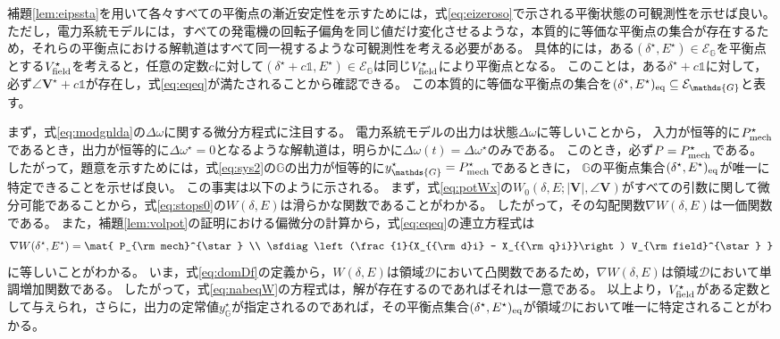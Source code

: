 \documentclass[tombow,dvipdfmx]{corona-a5}
\begin{document}
\begin{証明}
補題\ref{lem:eipssta}を用いて各々すべての平衡点の漸近安定性を示すためには，式\ref{eq:eizeroso}で示される平衡状態の可観測性を示せば良い。
ただし，電力系統モデルには，すべての発電機の回転子偏角を同じ値だけ変化させるような，本質的に等価な平衡点の集合が存在するため，それらの平衡点における解軌道はすべて同一視するような可観測性を考える必要がある。
具体的には，ある$(\delta^{\star},E^{\star}) \in \mathcal{E}_{\mathds{G}}$を平衡点とする$V_{\rm field}^{\star}$を考えると，任意の定数$c$に対して$(\delta^{\star}+c \mathds{1},E^{\star}) \in \mathcal{E}_{\mathds{G}}$は同じ$V_{\rm field}^{\star}$により平衡点となる。
このことは，ある$\delta^{\star}+c \mathds{1}$に対して，必ず$\angle \bm{V}^{\star}+c \mathds{1}$が存在し，式\ref{eq:eqeq}が満たされることから確認できる。
この本質的に等価な平衡点の集合を$(\delta^{\star} ,E^{\star})_{\rm eq} \subseteq \mathcal{E}_{\mathds{G}}$と表す。

まず，式\ref{eq:modgnlda}の$\Delta \omega$に関する微分方程式に注目する。
電力系統モデルの出力は状態$\Delta \omega$に等しいことから，
入力が恒等的に$P_{\rm mech}^{\star}$であるとき，出力が恒等的に$\Delta \omega^{\star}=0$となるような解軌道は，明らかに$\Delta \omega(t) = \Delta \omega^{\star}$のみである。
このとき，必ず$P = P_{\rm mech}^{\star}$である。
したがって，題意を示すためには，式\ref{eq:sys2}の$\mathds{G}$の出力が恒等的に$y_{\mathds{G}}^{\star} = P_{\rm mech}^{\star}$であるときに，
$\mathds{G}$の平衡点集合$(\delta^{\star} ,E^{\star})_{\rm eq}$が唯一に特定できることを示せば良い。
この事実は以下のように示される。
まず，式\ref{eq:potWx}の$W_0(\delta, E; |\bm{V}|, \angle \bm{V})$がすべての引数に関して微分可能であることから，式\ref{eq:stops0}の$W(\delta,E)$は滑らかな関数であることがわかる。
したがって，その勾配関数$\nabla W(\delta,E)$は一価関数である。
また，補題\ref{lem:volpot}の証明における偏微分の計算から，式\ref{eq:eqeq}の連立方程式は
\begin{align}\label{eq:nabeqW}
\nabla W(\delta^{\star},E^{\star})
=
\mat{
P_{\rm mech}^{\star} \\
\sfdiag\left(\frac{1}{X_{{\rm d}i} - X_{{\rm q}i}}\right) V_{\rm field}^{\star}
}
\end{align}
に等しいことがわかる。
いま，式\ref{eq:domDf}の定義から，$W(\delta,E)$は領域$\mathcal{D}$において凸関数であるため，$\nabla W(\delta,E)$は領域$\mathcal{D}$において単調増加関数である\cite{rockafellar1970convex,boyd2004convex}。
したがって，式\ref{eq:nabeqW}の方程式は，解が存在するのであればそれは一意である。
以上より，$V_{\rm field}^{\star}$がある定数として与えられ，さらに，出力の定常値$y_{\mathds{G}}^{\star}$が指定されるのであれば，その平衡点集合$(\delta^{\star} ,E^{\star})_{\rm eq}$が領域$\mathcal{D}$において唯一に特定されることがわかる。


\end{証明}
\end{document}
